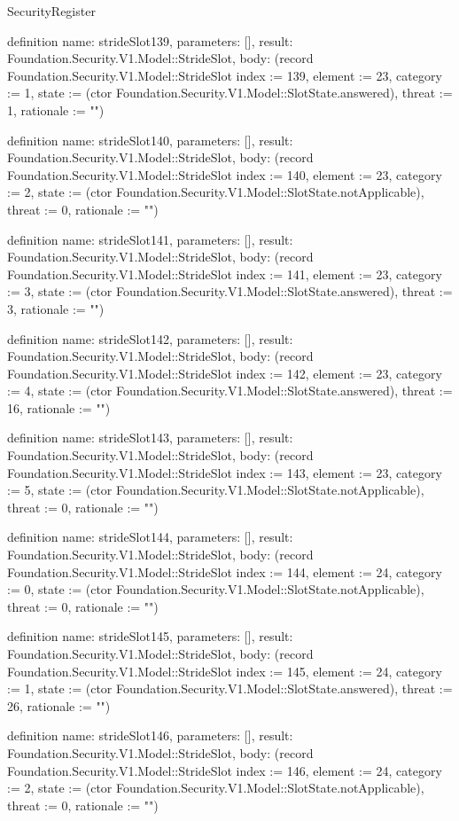 \begin{lexlean}{SecurityRegister}
\begin{semanticmodule}
definition{
  name: strideSlot139,
  parameters: [],
  result: Foundation.Security.V1.Model::StrideSlot,
  body: (record Foundation.Security.V1.Model::StrideSlot {index := 139, element := 23, category := 1, state := (ctor Foundation.Security.V1.Model::SlotState.answered), threat := 1, rationale := ""})
}

definition{
  name: strideSlot140,
  parameters: [],
  result: Foundation.Security.V1.Model::StrideSlot,
  body: (record Foundation.Security.V1.Model::StrideSlot {index := 140, element := 23, category := 2, state := (ctor Foundation.Security.V1.Model::SlotState.notApplicable), threat := 0, rationale := ""})
}

definition{
  name: strideSlot141,
  parameters: [],
  result: Foundation.Security.V1.Model::StrideSlot,
  body: (record Foundation.Security.V1.Model::StrideSlot {index := 141, element := 23, category := 3, state := (ctor Foundation.Security.V1.Model::SlotState.answered), threat := 3, rationale := ""})
}

definition{
  name: strideSlot142,
  parameters: [],
  result: Foundation.Security.V1.Model::StrideSlot,
  body: (record Foundation.Security.V1.Model::StrideSlot {index := 142, element := 23, category := 4, state := (ctor Foundation.Security.V1.Model::SlotState.answered), threat := 16, rationale := ""})
}

definition{
  name: strideSlot143,
  parameters: [],
  result: Foundation.Security.V1.Model::StrideSlot,
  body: (record Foundation.Security.V1.Model::StrideSlot {index := 143, element := 23, category := 5, state := (ctor Foundation.Security.V1.Model::SlotState.notApplicable), threat := 0, rationale := ""})
}

definition{
  name: strideSlot144,
  parameters: [],
  result: Foundation.Security.V1.Model::StrideSlot,
  body: (record Foundation.Security.V1.Model::StrideSlot {index := 144, element := 24, category := 0, state := (ctor Foundation.Security.V1.Model::SlotState.notApplicable), threat := 0, rationale := ""})
}

definition{
  name: strideSlot145,
  parameters: [],
  result: Foundation.Security.V1.Model::StrideSlot,
  body: (record Foundation.Security.V1.Model::StrideSlot {index := 145, element := 24, category := 1, state := (ctor Foundation.Security.V1.Model::SlotState.answered), threat := 26, rationale := ""})
}

definition{
  name: strideSlot146,
  parameters: [],
  result: Foundation.Security.V1.Model::StrideSlot,
  body: (record Foundation.Security.V1.Model::StrideSlot {index := 146, element := 24, category := 2, state := (ctor Foundation.Security.V1.Model::SlotState.notApplicable), threat := 0, rationale := ""})
}


\end{semanticmodule}
\end{lexlean}

